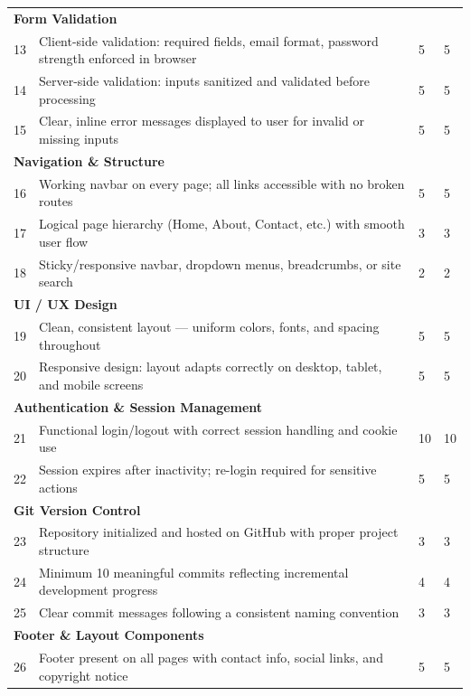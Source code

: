 \documentclass[12pt,a4paper]{article}
\begin{document}
\begin{longtable}{p{0.5cm} p{9cm} p{1.8cm} p{1.8cm}}
\multicolumn{4}{l}{\textbf{Form Validation}} \\[4pt]
13 & Client-side validation: required fields, email format, password strength enforced in browser & 5 & 5 \\[4pt]
14 & Server-side validation: inputs sanitized and validated before processing & 5 & 5 \\[4pt]
15 & Clear, inline error messages displayed to user for invalid or missing inputs & 5 & 5 \\[8pt]

\multicolumn{4}{l}{\textbf{Navigation \& Structure}} \\[4pt]
16 & Working navbar on every page; all links accessible with no broken routes & 5 & 5 \\[4pt]
17 & Logical page hierarchy (Home, About, Contact, etc.) with smooth user flow & 3 & 3 \\[4pt]
18 & Sticky/responsive navbar, dropdown menus, breadcrumbs, or site search & 2 & 2 \\[8pt]

\multicolumn{4}{l}{\textbf{UI / UX Design}} \\[4pt]
19 & Clean, consistent layout --- uniform colors, fonts, and spacing throughout & 5 & 5 \\[4pt]
20 & Responsive design: layout adapts correctly on desktop, tablet, and mobile screens & 5 & 5 \\[8pt]

\multicolumn{4}{l}{\textbf{Authentication \& Session Management}} \\[4pt]
21 & Functional login/logout with correct session handling and cookie use & 10 & 10 \\[4pt]
22 & Session expires after inactivity; re-login required for sensitive actions & 5 & 5 \\[8pt]

\multicolumn{4}{l}{\textbf{Git Version Control}} \\[4pt]
23 & Repository initialized and hosted on GitHub with proper project structure & 3 & 3 \\[4pt]
24 & Minimum 10 meaningful commits reflecting incremental development progress & 4 & 4 \\[4pt]
25 & Clear commit messages following a consistent naming convention & 3 & 3 \\[8pt]

\multicolumn{4}{l}{\textbf{Footer \& Layout Components}} \\[4pt]
26 & Footer present on all pages with contact info, social links, and copyright notice & 5 & 5 \\[8pt]


\end{longtable}
\end{document}
